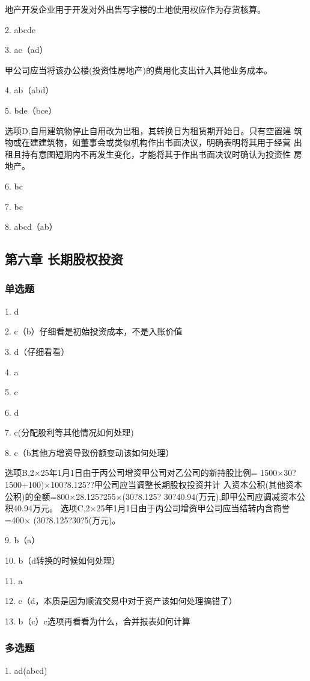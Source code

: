 \documentclass[UTF8,12pt]{ctexart}
\numberwithin{equation}{section} %
\numberwithin{figure}{section}
\numberwithin{table}{section}
\begin{document}
	地产开发企业用于开发对外出售写字楼的土地使用权应作为存货核算。
	
	2. abcde
	
	3. ac（ad）
	
	甲公司应当将该办公楼(投资性房地产)的费用化支出计入其他业务成本。
	
	4. ab（abd）
	
	5. bde（bce）
	
	选项D,自用建筑物停止自用改为出租，其转换日为租赁期开始日。只有空置建
	筑物或在建建筑物，如董事会或类似机构作出书面决议，明确表明将其用于经营
	出租且持有意图短期内不再发生变化，才能将其于作出书面决议时确认为投资性
	房地产。
	
	6. bc
	
	7. bc
	
	8. abcd（ab）
	
	\subsection{第六章 长期股权投资}
	\subsubsection{单选题}
	1. d
	
	2. c（b）仔细看是初始投资成本，不是入账价值
	
	3. d（仔细看看）
	
	4. a
	
	5. c
	
	6. d
	
	7. c(分配股利等其他情况如何处理)
	
	8. c（b其他方增资导致份额变动该如何处理）
	
	选项B,2×25年1月1日由于丙公司增资甲公司对乙公司的新持股比例=
	1500×30?1500+100)×100?8.125??甲公司应当调整长期股权投资并计
	入资本公积(其他资本公积)的金额=800×28.125?255×(30?8.125?
	30?40.94(万元),即甲公司应调减资本公积40.94万元。
	选项C,2×25年1月1日由于丙公司增资甲公司应当结转内含商誉=400×
	(30?8.125?30?5(万元)。
	
	9. b（a）
	
	10. b（d转换的时候如何处理）
	
	11. a
	
	12. c（d，本质是因为顺流交易中对于资产该如何处理搞错了）
	
	13. b（c）c选项再看看为什么，合并报表如何计算
	
	\subsubsection{多选题}
	1. ad(abcd)
	
\end{document}
